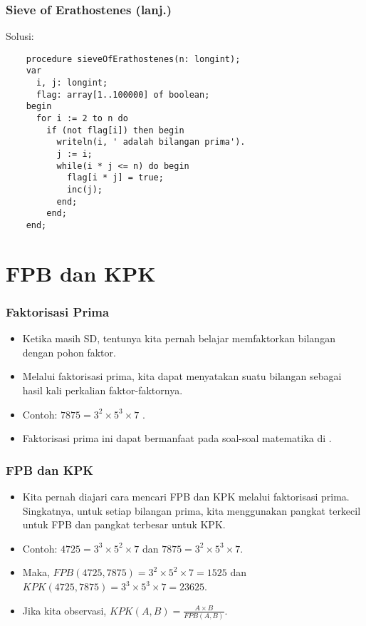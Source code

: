\begin{frame}[fragile]
\frametitle{Sieve of Erathostenes (lanj.)}
Solusi:
  \begin{lstlisting}
    procedure sieveOfErathostenes(n: longint);
    var
      i, j: longint;
      flag: array[1..100000] of boolean;
    begin
      for i := 2 to n do 
        if (not flag[i]) then begin
          writeln(i, ' adalah bilangan prima').
          j := i;
          while(i * j <= n) do begin
            flag[i * j] = true;
            inc(j);
          end;
        end;
    end;  
  \end{lstlisting}
\end{frame}

\section{FPB dan KPK}
\frame{\sectionpage}

\begin{frame}
\frametitle{Faktorisasi Prima}
\begin{itemize}
  \item Ketika masih SD, tentunya kita pernah belajar memfaktorkan bilangan dengan pohon faktor.
  \item Melalui faktorisasi prima, kita dapat menyatakan suatu bilangan sebagai hasil kali perkalian faktor-faktornya.
  \item Contoh: $7875 = 3^{2} \times 5^{3} \times 7$ .
  \item Faktorisasi prima ini dapat bermanfaat pada soal-soal matematika di .
\end{itemize}
\end{frame}

\begin{frame}
\frametitle{FPB dan KPK}
\begin{itemize}
  \item Kita pernah diajari cara mencari FPB dan KPK melalui faktorisasi prima. Singkatnya, untuk setiap bilangan prima, kita menggunakan pangkat terkecil untuk FPB dan pangkat terbesar untuk KPK.
  \item Contoh: $4725 = 3^{3} \times 5^{2} \times 7$ dan $7875 = 3^{2} \times 5^{3} \times 7$.
  \item Maka, $FPB(4725,7875) = 3^{2} \times 5^{2} \times 7 = 1525$ dan $KPK(4725,7875) = 3^{3} \times 5^{3} \times 7 = 23625$.
  \item Jika kita observasi, $KPK(A,B) = \frac{A \times B}{FPB(A,B)}$. 
\end{itemize}
\end{frame}


